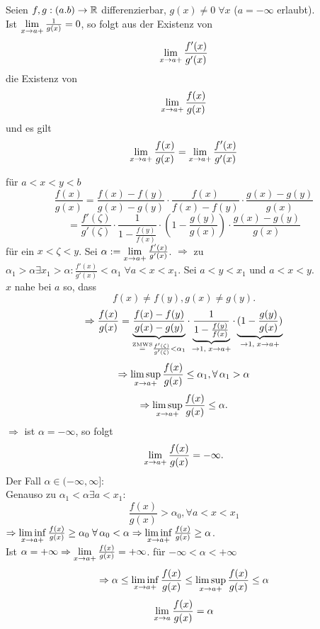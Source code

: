 \documentclass[../ana2.tex]{subfiles}
\begin{document}
\begin{satz}
    Seien \( f,g : (a.b) \rightarrow \mathbb{R} \) differenzierbar,
    \( g(x) \neq 0 \;\forall x  \) (\(a = -\infty\) erlaubt). \\
    Ist \( \lim\limits_{x\rightarrow{}a+} \frac{1}{g(x)} = 0 \), so folgt aus der 
    Existenz von 
    \[ \lim\limits_{x\rightarrow{}a+} \frac{f'(x)}{g'(x)} \] 
    die Existenz von
    \[ \lim\limits_{x\rightarrow{}a+} \frac{f(x)}{g(x)} \]
    und es gilt
    \[ \lim\limits_{x\rightarrow{}a+} \frac{f(x)}{g(x)} 
    = \lim\limits_{x\rightarrow{}a+} \frac{f'(x)}{g'(x)} \]
\end{satz}
\begin{bew}
    für \( a < x < y < b \)
    \[ \frac{f(x)}{g(x)} = \frac{f(x) - f(y)}{g(x) -g(y)} 
    \cdot \frac{f(x)}{f(x)-f(y)} \cdot \frac{g(x)-g(y)}{g(x)} \]
    \[ = \frac{f'(\zeta)}{g'(\zeta)} \cdot 
    \frac{1}{1-\frac{f(y)}{f(x)}} \cdot 
    \left(1 - \frac{g(y)}{g(x)} \right) \cdot %
    \frac{g(x)-g(y)}{g(x)} \]
    für ein \( x < \zeta < y \).
    Sei \( \alpha := \lim\limits_{x\rightarrow{}a+} \frac{f'(x)}{g'(x)} \).
    \( \Rightarrow \) zu \( \alpha_1 > \alpha \exists 
    x_1 > \alpha : \frac{f'(x)}{g'(x)} < \alpha_1 
    \;\forall a < x < x_1 \).
    Sei \( a < y < x_1 \) und \(a < x < y \). \\
    \(x\) nahe bei \(a\) so, dass
    \[ f(x) \neq f(y), g(x) \neq g(y). \]
    \[ \Rightarrow \frac{f(x)}{g(x)} 
    = \underbrace{\frac{f(x)-f(y)}{g(x)-g(y)}}_{
        \overset{\text{ZMWS}}{=} \frac{f'(\zeta)}{g'(\zeta)} < \alpha_1
    }
    \cdot \underbrace{\frac{1}{1-\frac{f(y)}{f(x)}} }_{
        \rightarrow 1, \;x\rightarrow a+}
    \cdot \underbrace{(1- \frac{g(y)}{g(x)})}_{
        \rightarrow 1, \;x\rightarrow a+} \]
    \[ \Rightarrow \limessupx{x}{a+} \frac{f(x)}{g(x)} 
    \leq \alpha_1, \forall \alpha_1 > \alpha \]
    \[ \Rightarrow \limsup\limits_{x\rightarrow{}a+} \frac{f(x)}{g(x)} \leq \alpha. \]
    \( \Rightarrow \) ist \( \alpha = -\infty \), so folgt 
    \[ \lim\limits_{x\rightarrow{}a+} \frac{f(x)}{g(x)} = -\infty. \]
    Der Fall \( \alpha \in (-\infty, \infty]: \) \\
    Genauso zu \( \alpha_1 < \alpha \exists a < x_1: \)
    \[ \frac{f(x)}{g(x)} > \alpha_0, \forall a < x < x_1 \]
    \( \Rightarrow \limesinfx{x}{a+} \frac{f(x)}{g(x)} 
    \geq \alpha_0\;\forall \alpha_0 < \alpha \\
    \Rightarrow \limesinfx{x}{a+} \frac{f(x)}{g(x)} \geq \alpha \).\\
    Ist \( \alpha = +\infty \Rightarrow \lim\limits_{x\rightarrow{}a+} 
    \frac{f(x)}{g(x)} = +\infty \).    
    für \( -\infty < \alpha < +\infty \)
    \[ \Rightarrow \alpha \leq \liminf\limits_{x\rightarrow{}a+} \frac{f(x)}{g(x)} 
    \leq \limsup\limits_{x\rightarrow{}a+} \frac{f(x)}{g(x)} \leq \alpha \]
    \[ \lim\limits_{x\rightarrow{}a} \frac{f(x)}{g(x)} = \alpha \]
\end{bew}
\end{document}
